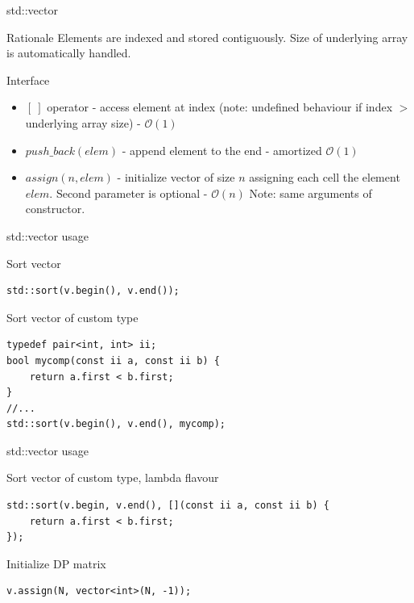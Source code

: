 \documentclass[compress]{beamer}
\begin{document}
\begin{frame}{std::vector}
    \begin{block}{Rationale}
        Elements are indexed and stored contiguously. Size of underlying array is automatically handled.
    \end{block}\pause

    \begin{block}{Interface}
        \begin{itemize}
            \item $[~]$ operator - access element at index (note: undefined behaviour if index $>$ underlying array size) - $\mathcal{O}(1)$
            \item $push\_back(elem)$ - append element to the end - amortized $\mathcal{O}(1)$
            \item $assign(n, elem)$ - initialize vector of size $n$ assigning each cell the element $elem$. Second parameter is optional - $\mathcal{O}(n)$ Note: same arguments of constructor.
        \end{itemize}
    \end{block}
\end{frame}

\begin{frame}[fragile]{std::vector usage}
    \begin{block}{Sort vector}
        \begin{lstlisting}
std::sort(v.begin(), v.end());
\end{lstlisting}
    \end{block}
    \begin{block}{Sort vector of custom type}
        \begin{lstlisting}
typedef pair<int, int> ii;
bool mycomp(const ii a, const ii b) {
    return a.first < b.first;
}
//...
std::sort(v.begin(), v.end(), mycomp);
\end{lstlisting}
    \end{block}
\end{frame}
\begin{frame}[fragile]{std::vector usage}
    \begin{block}{Sort vector of custom type, lambda flavour}
        \begin{lstlisting}
std::sort(v.begin, v.end(), [](const ii a, const ii b) {
    return a.first < b.first;
});
\end{lstlisting}
    \end{block}
    \begin{block}{Initialize DP matrix}
        \begin{lstlisting}
v.assign(N, vector<int>(N, -1));
\end{lstlisting}
    \end{block}
\end{frame}
\end{document}
